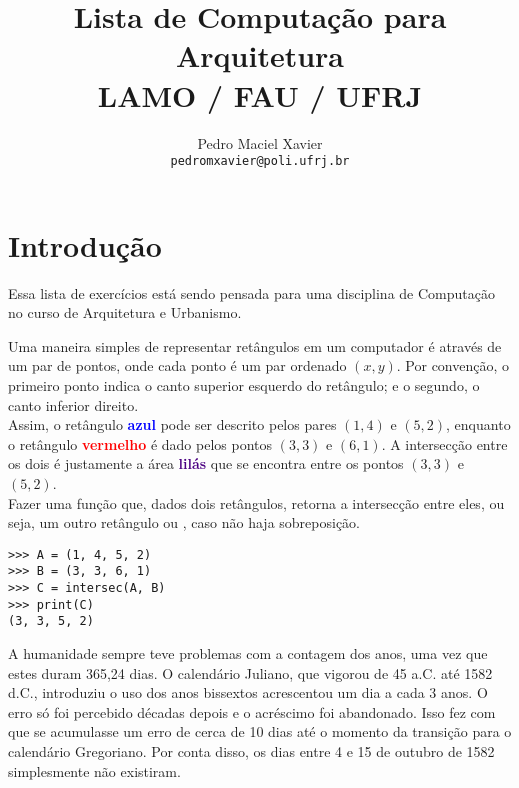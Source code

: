 \documentclass[12pt]{article}
\title{%
Lista de Computação para Arquitetura\\
{\normalsize LAMO / FAU / UFRJ}
}
\author{%
Pedro Maciel Xavier \\ 
\texttt{pedromxavier@poli.ufrj.br}
}
\begin{document}
	\maketitle
	\section*{Introdução}
	
	Essa lista de exercícios está sendo pensada para uma disciplina de Computação no curso de Arquitetura e Urbanismo.
	
	\cc
	
	
	
	Uma maneira simples de representar retângulos em um computador é através de um par de pontos, onde cada ponto é um par ordenado $(x, y)$. Por convenção, o primeiro ponto indica o canto superior esquerdo do retângulo; e o segundo, o canto inferior direito.\\
	
	
	
	Assim, o retângulo \textcolor{blue}{\textbf{azul}} pode ser descrito pelos pares $(1, 4)$ e $(5, 2)$, enquanto o retângulo \textcolor{red}{\textbf{vermelho}} é dado pelos pontos $(3, 3)$ e $(6, 1)$. A intersecção entre os dois é justamente a área \textcolor{indigo}{\textbf{lilás}} que se encontra entre os pontos $(3, 3)$ e $(5, 2)$. \\
	
	\quest Fazer uma função que, dados dois retângulos, retorna a intersecção entre eles, ou seja, um outro retângulo ou , caso não haja sobreposição.\\
	
	\example
	\begin{lstlisting}
>>> A = (1, 4, 5, 2)
>>> B = (3, 3, 6, 1)
>>> C = intersec(A, B)
>>> print(C)
(3, 3, 5, 2)
	\end{lstlisting}
	
	\pagebreak
	
	
	A humanidade sempre teve problemas com a contagem dos anos, uma vez que estes duram 365,24 dias. O calendário Juliano, que vigorou de 45 a.C. até 1582 d.C., introduziu o uso dos anos bissextos acrescentou um dia a cada 3 anos. O erro só foi percebido décadas depois e o acréscimo foi abandonado. Isso fez com que se acumulasse um erro de cerca de 10 dias até o momento da transição para o calendário Gregoriano. Por conta disso, os dias entre 4 e 15 de outubro de 1582 simplesmente não existiram.\\
	
\end{document}
